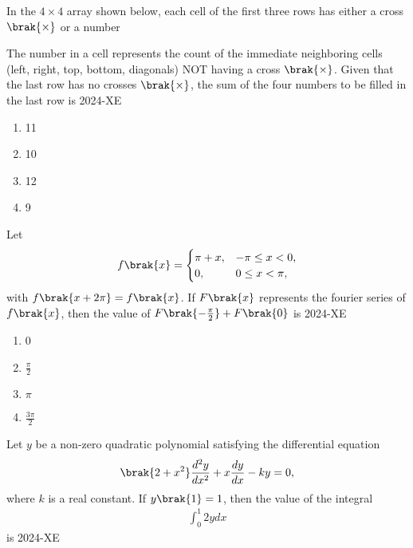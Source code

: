 \item In the $4 \times 4$ array shown below, each cell of the first three rows has either a cross $\brak{ \times}$ or a number \\
	\begin{table}[ht]
		\centering
		
	\end{table}
The number in a cell represents the count of the immediate neighboring cells (left, right, top, bottom, diagonals) NOT having a cross $\brak{ \times}$. Given that the last row has no crosses $\brak{ \times}$, the sum of the four numbers to be filled in the last row is
\hfill{2024-XE}

		\begin{enumerate}
			\item 11
			\item 10
			\item 12
			\item 9
		\end{enumerate}




\item Let 
	\begin{align*}
		f\brak{x}= \begin{cases}
			 	\pi + x, & -\pi \leq x < 0, \\
				0, & 0 \leq x < \pi,
		\end{cases}
	\end{align*}
with $f\brak{x + 2\pi}=f\brak{x}$. If $F\brak{x}$ represents the fourier series of $f\brak{x}$, then the value of $F\brak{-\frac{\pi}{2}}+F\brak{0}$ is
\hfill{2024-XE}

		\begin{enumerate}
			\item 0
			\item $\frac{\pi}{2}$
			\item $\pi$
			\item $\frac{3\pi}{2}$
		\end{enumerate}

\item Let $y$ be a non-zero quadratic polynomial satisfying the differential equation 
	\begin{align*}
		\brak{2+x^2}\frac{d^2y}{dx^2}+x\frac{dy}{dx}-ky=0,
	\end{align*}
		where $k$ is a real constant. If $y\brak{1}=1$, then the value of the integral
		\begin{align*}
			\int_0 ^1 2y dx
		\end{align*}
		is
\hfill{2024-XE}

